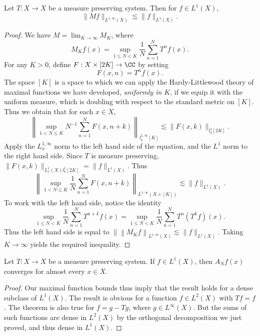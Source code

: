 \begin{theorem}
    Let $T: X \to X$ be a measure preserving system. Then for $f \in L^1(X)$,
    \[ \| Mf \|_{L^{1,\infty}(X)} \lesssim \| f \|_{L^1(X)}. \]
\end{theorem}
\begin{proof}
    We have $M = \lim_{K \to \infty} M_K$, where
    \[ M_K f(x) = \sup_{1 \leq N < K} \frac{1}{N} \sum_{n = 1}^N T^n f(x). \]
    For any $K > 0$, define $F: X \times [2K] \to \CC$ by setting
    \[ F(x,n) = T^nf(x). \]
    The space $[K]$ is a space to which we can apply the Hardy-Littlewood theory of maximal functions we have developed, \emph{uniformly in $K$}, if we equip it with the uniform measure, which is doubling with respect to the standard metric on $[K]$. Thus we obtain that for each $x \in X$,
    \[ \left\| \sup_{1 < N \leq K} N^{-1} \sum_{n = 1}^N F(x,n+k) \right\|_{l^{1,\infty}_k[K]} \lesssim \| F(x,k) \|_{l^1_k[2K]}. \]
    Apply the $L^{1,\infty}_x$ norm to the left hand side of the equation, and the $L^1$ norm to the right hand side. Since $T$ is measure preserving, $\| F(x,k) \|_{L^1_x(X) l^1_k[2K]} = \| f \|_{L^1(X)}$. Thus
    \[ \left\| \sup_{1 < N \leq K} \frac{1}{N} \sum_{n = 1}^N F(x,n+k) \right\|_{L^{1,\infty}(X \times [K])} \lesssim \| f \|_{L^1(X)}. \]
    To work with the left hand side, notice the identity
    \[ \sup_{1 \leq N < K} \frac{1}{N} \sum_{n = 1}^N T^{n+k} f(x) = \sup_{1 \leq N < K} \frac{1}{N} \sum_{n = 1}^N T^n (T^k f)(x). \]
    Thus the left hand side is equal to $\| \left\| M_K f \right\|_{L^{1,\infty}(X)} \lesssim \| f \|_{L^1(X)}$. Taking $K \to \infty$ yields the required inequality.
\end{proof}

\begin{corollary}
    Let $T: X \to X$ be a measure preserving system. If $f \in L^1(X)$, then $A_N f(x)$ converges for almost every $x \in X$.
\end{corollary}
\begin{proof}
    Our maximal function bounds thus imply that the result holds for a dense subclass of $L^1(X)$. The result is obvious for a function $f \in L^2(X)$ with $Tf = f$. The theorem is also true for $f = g - Tg$, where $g \in L^\infty(X)$. But the sums of such functions are dense in $L^2(X)$ by the orthogonal decomposition we just proved, and thus dense in $L^1(X)$.
\end{proof}

